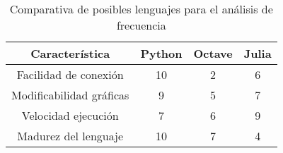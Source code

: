    \begin{table}[ht]
        \caption[Comparativa de posibles lenguajes para el análisis de frecuencia]{Comparativa de posibles lenguajes para el análisis de frecuencia}
        \label{tab:LenguajesAnalisisFrecuencia}
        \begin{center}
            \vspace{0.3cm}
            \begin{tabular}{|c|c|c|c|}
                \hline
                Característica              & Python & Octave & Julia\\\hline
                \hline
                Facilidad de conexión       & 10    & 2     & 6 \\\hline
                Modificabilidad gráficas    & 9     & 5     & 7 \\\hline
                Velocidad ejecución         & 7     & 6     & 9 \\\hline
                Madurez del lenguaje        & 10    & 7     & 4 \\\hline
            \end{tabular}
        \end{center}
    \end{table}


